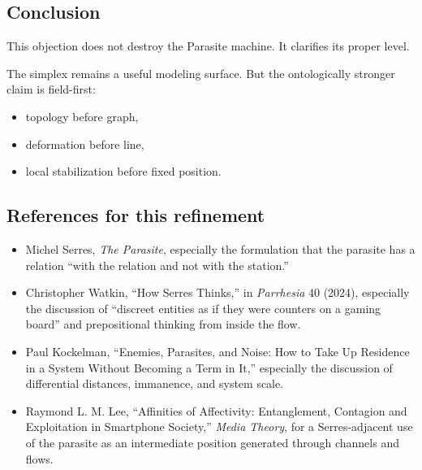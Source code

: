 \subsection*{Conclusion}

This objection does not destroy the Parasite machine.
It clarifies its proper level.

The simplex remains a useful modeling surface.
But the ontologically stronger claim is field-first:

\begin{itemize}
\item topology before graph,
\item deformation before line,
\item local stabilization before fixed position.
\end{itemize}

\subsection*{References for this refinement}

\begin{itemize}
\item Michel Serres, \emph{The Parasite}, especially the formulation that the parasite has a relation ``with the relation and not with the station.''

\item Christopher Watkin, ``How Serres Thinks,'' in \emph{Parrhesia} 40 (2024), especially the discussion of ``discreet entities as if they were counters on a gaming board'' and prepositional thinking from inside the flow.

\item Paul Kockelman, ``Enemies, Parasites, and Noise: How to Take Up Residence in a System Without Becoming a Term in It,'' especially the discussion of differential distances, immanence, and system scale.

\item Raymond L. M. Lee, ``Affinities of Affectivity: Entanglement, Contagion and Exploitation in Smartphone Society,'' \emph{Media Theory}, for a Serres-adjacent use of the parasite as an intermediate position generated through channels and flows.
\end{itemize}

